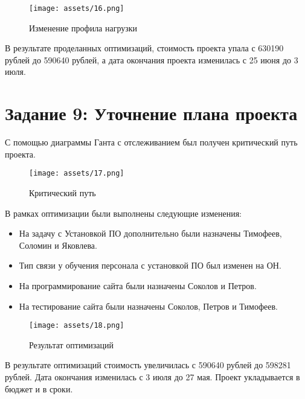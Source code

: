 \begin{figure}[H]
    \begin{center}
    \texttt{[image: assets/16.png]}
    \caption{Изменение профила нагрузки}
    \label{fig:16}
    \end{center}
\end{figure}


В результате проделанных оптимизаций, стоимость проекта упала с 630190 рублей до 590640 рублей, а дата окончания проекта изменилась с 25 июня до 3 июля.

\section{Задание 9: Уточнение плана проекта}

С помощью диаграммы Ганта с отслеживанием был получен критический путь проекта.

\begin{figure}[H]
    \begin{center}
    \texttt{[image: assets/17.png]}
    \caption{Критический путь}
    \label{fig:17}
    \end{center}
\end{figure}

В рамках оптимизации были выполнены следующие изменения:

\begin{itemize}
	\item На задачу с Установкой ПО дополнительно были назначены Тимофеев, Соломин и Яковлева.
	\item Тип связи у обучения персонала с установкой ПО был изменен на ОН.
	\item На программирование сайта были назначены Соколов и Петров.
	\item На тестирование сайта были назначены Соколов, Петров и Тимофеев.
\end{itemize}

\begin{figure}[H]
    \begin{center}
    \texttt{[image: assets/18.png]}
    \caption{Результат оптимизаций}
    \label{fig:18}
    \end{center}
\end{figure}

В результате оптимизаций стоимость увеличилась с 590640 рублей до 598281 рублей. Дата окончания изменилась с 3 июля до 27 мая. Проект укладывается в бюджет и в сроки.

